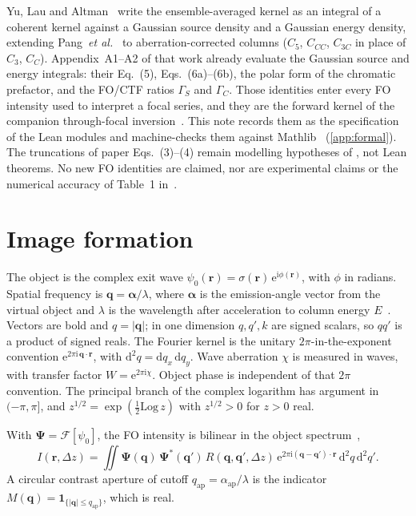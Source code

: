 \documentclass[11pt,a4paper]{article}
\theoremstyle{definition}
\theoremstyle{remark}
\newcommand{\dd}{\mathrm{d}}
\newcommand{\ee}{\mathrm{e}}
\newcommand{\ii}{\mathrm{i}}
\newcommand{\abs}[1]{\lvert#1\rvert}
\newcommand{\qap}{q_{\mathrm{ap}}}
\newcommand{\Dz}{\Delta z}
\begin{document}
Yu, Lau and Altman~\cite{Yu2019} write the ensemble-averaged kernel as
an integral of a coherent kernel against a Gaussian source density and
a Gaussian energy density, extending Pang~\emph{et al.}~\cite{Pang2009}
to aberration-corrected columns ($C_5$, $C_{CC}$, $C_{3C}$ in place of
$C_3$, $C_C$).
Appendix~A1--A2 of that work already evaluate the Gaussian source and
energy integrals: their Eq.~(5), Eqs.~(6a)--(6b), the polar form of
the chromatic prefactor, and the FO/CTF ratios $\Gamma_S$ and
$\Gamma_C$.
Those identities enter every FO intensity used to interpret a focal
series, and they are the forward kernel of the companion through-focal
inversion~\cite{Lau2026inverse}.
This note records them as the specification of the Lean modules
and machine-checks them against Mathlib~\cite{deMoura2021,mathlib2020}
(\cref{app:formal}).
The truncations of paper Eqs.~(3)--(4) remain modelling hypotheses of
\cite{Yu2019}, not Lean theorems.
No new FO identities are claimed, nor are experimental claims or the
numerical accuracy of Table~1 in~\cite{Yu2019}.

\section{Image formation}
\label{sec:formation}

The object is the complex exit wave
$\psi_0(\mathbf{r})=\sigma(\mathbf{r})\,\ee^{\ii\phi(\mathbf{r})}$,
with $\phi$ in radians.
Spatial frequency is $\mathbf{q}=\boldsymbol{\alpha}/\lambda$, where
$\boldsymbol{\alpha}$ is the emission-angle vector from the virtual object
and $\lambda$ is the wavelength after acceleration to column energy
$E$~\cite{Tromp2012,Schramm2012}.
Vectors are bold and $q=\abs{\mathbf{q}}$; in one dimension $q,q',k$
are signed scalars, so $qq'$ is a product of signed reals.
The Fourier kernel is the unitary $2\pi$-in-the-exponent convention
$\ee^{2\pi\ii\,\mathbf{q}\cdot\mathbf{r}}$, with
$\dd^2q=\dd q_x\,\dd q_y$.
Wave aberration $\chi$ is measured in waves, with transfer factor
$W=\ee^{2\pi\ii\chi}$.
Object phase is independent of that $2\pi$ convention.
The principal branch of the complex logarithm has argument in
$(-\pi,\pi]$, and $z^{1/2}=\exp(\tfrac12\mathrm{Log}\,z)$ with
$z^{1/2}>0$ for $z>0$ real.

With $\boldsymbol{\Psi}=\mathcal{F}[\psi_0]$, the FO intensity is bilinear
in the object spectrum~\cite{Goodman2005,Pang2009,Yu2019},
\begin{equation}
\label{eq:I}
I(\mathbf{r},\Dz)
=\iint
\boldsymbol{\Psi}(\mathbf{q})\,\boldsymbol{\Psi}^*(\mathbf{q}')
\,R(\mathbf{q},\mathbf{q}',\Dz)
\,\ee^{2\pi\ii(\mathbf{q}-\mathbf{q}')\cdot\mathbf{r}}
\,\dd^2q\,\dd^2q'.
\end{equation}
A circular contrast aperture of cutoff $\qap=\alpha_{\mathrm{ap}}/\lambda$
is the indicator $M(\mathbf{q})=\mathbf{1}_{\{\abs{\mathbf{q}}\le\qap\}}$,
which is real.
\end{document}
